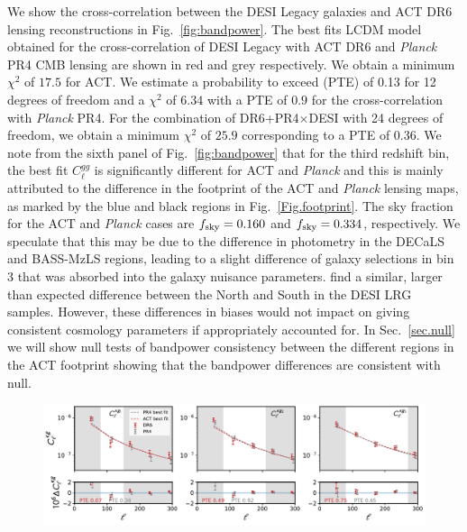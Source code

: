 \documentclass[twocolumn]{aastex631}
\begin{document}
{We show the cross-correlation between the DESI Legacy galaxies and ACT DR6 lensing reconstructions in Fig.~\ref{fig:bandpower}. The best fits LCDM model obtained for the cross-correlation of DESI Legacy with ACT DR6 and \textit{Planck} PR4 CMB lensing are shown in red and grey respectively. We obtain a minimum $\chi^2$ of $17.5$ for ACT.  We estimate a probability to exceed (PTE) of 0.13 for 12 degrees of freedom and a $\chi^2$ of $6.34$ with a PTE of $0.9$ for the cross-correlation with \textit{Planck} PR4. For the combination of DR6+PR4$\times$DESI with 24 degrees of freedom, we obtain a minimum $\chi^2$ of $25.9$ corresponding to a PTE of 0.36. We note from the sixth panel of Fig.~\ref{fig:bandpower} that for the third redshift bin, the best fit $C^{gg}_\ell$ is significantly different for ACT and \textit{Planck} and this is mainly attributed to the difference in the footprint of the ACT and \textit{Planck} lensing maps, {as marked by the blue and black regions in Fig.~\ref{Fig.footprint}. }{The sky fraction for the ACT and {\it Planck} cases are $f_{\rm sky}=0.160$ and $f_{\rm sky}=0.334$, respectively. }{We speculate that this may be due to the difference in photometry in the DECaLS and BASS-MzLS regions, leading to a slight difference of galaxy selections in bin 3 that was absorbed into the galaxy nuisance parameters. \cite{Sailer2024} find a similar, larger than expected difference between the North and South  in the DESI LRG samples. However, these  differences in biases would not impact on giving consistent cosmology parameters if appropriately accounted for. } In Sec.~\ref{sec.null} we will show null tests of bandpower consistency between the different regions in the ACT footprint showing that the bandpower differences are consistent with null.


\begin{figure}
    \centering
    \includegraphics[width=\linewidth]{figures/kg_best.pdf} \\ %
    \vspace{-8pt} %
    

\end{figure}}
\end{document}
